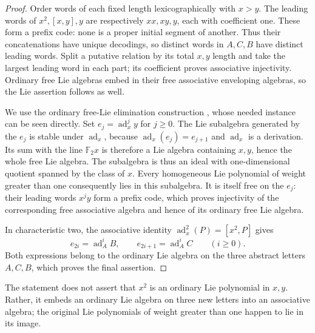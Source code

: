 \documentclass[11pt]{article}
\theoremstyle{definition}
\theoremstyle{remark}
\numberwithin{equation}{section}
\begin{document}
\begin{proof}
Order words of each fixed length lexicographically with $x>y$.
The leading words of $x^2,[x,y],y$ are respectively $xx,xy,y$, each with
coefficient one.  These form a prefix code: none is a proper initial
segment of another.  Thus their concatenations have unique decodings,
so distinct words in $A,C,B$ have distinct leading words.  Split a
putative relation by its total $x,y$ length and take the largest
leading word in each part; its coefficient proves associative
injectivity.  Ordinary free Lie algebras embed in their free associative
enveloping algebras, so the Lie assertion follows as well.

We use the ordinary free-Lie elimination construction
\cite[Theorem~0.6]{Reutenauer}, whose needed instance can be seen directly.
Set $e_j=\operatorname{ad}_x^j y$ for $j\geq0$.  The Lie subalgebra generated by the
$e_j$ is stable under $\operatorname{ad}_x$, because $\operatorname{ad}_x(e_j)=e_{j+1}$ and
$\operatorname{ad}_x$ is a derivation.  Its sum with the line ${\mathbb F_2} x$ is therefore a
Lie algebra containing $x,y$, hence the whole free Lie algebra.  The
subalgebra is thus an ideal with one-dimensional quotient spanned by
the class of $x$.  Every homogeneous Lie polynomial of weight greater
than one consequently lies in this subalgebra.  It is itself free on
the $e_j$: their leading words $x^j y$ form a prefix code, which proves
injectivity of the corresponding free associative algebra and hence
of its ordinary free Lie algebra.

In characteristic two, the associative identity
$\operatorname{ad}_x^2(P)=[x^2,P]$ gives
\begin{equation}\label{eq:elimination-abc}
 e_{2i}=\operatorname{ad}_A^i B,\qquad e_{2i+1}=\operatorname{ad}_A^i C\qquad(i\geq0).
\end{equation}
Both expressions belong to the ordinary Lie algebra on the three
abstract letters $A,C,B$, which proves the final assertion.
\end{proof}

The statement does not assert that $x^2$ is an ordinary Lie polynomial
in $x,y$.  Rather, it embeds an ordinary Lie algebra on three new
letters into an associative algebra; the original Lie polynomials of
weight greater than one happen to lie in its image.
\end{document}
